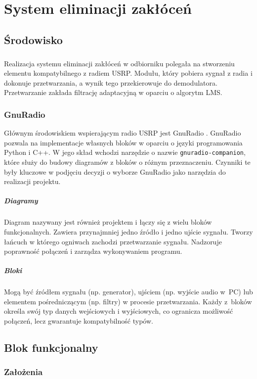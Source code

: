 \chapter{System eliminacji zakłóceń}
\section{Środowisko}
\paragraph{}
Realizacja systemu eliminacji zakłóceń w odbiorniku polegała na stworzeniu elementu kompatybilnego z radiem USRP. Modułu, który pobiera sygnał z radia i dokonuje przetwarzania, a wynik tego przekierowuje do demodulatora.
Przetwarzanie zakłada filtrację adaptacyjną w oparciu o algorytm LMS.
\subsection{GnuRadio}
Głównym środowiskiem wspierającym radio USRP jest GnuRadio \cite{gnuradio}. GnuRadio pozwala na implementacje własnych bloków w oparciu o języki programowania Python i C++. W jego skład wchodzi narzędzie o nazwie \texttt{gnuradio-companion}, które służy do budowy diagramów z bloków o różnym przeznaczeniu. Czynniki te były kluczowe w podjęciu decyzji o wyborze GnuRadio jako narzędzia do realizacji projektu.
\paragraph*{Diagramy}
    Diagram nazywany jest również projektem i łączy się z wielu bloków funkcjonalnych.
    Zawiera przynajmniej jedno źródło i jedno ujście sygnału.
    Tworzy łańcuch w którego ogniwach zachodzi przetwarzanie sygnału.
    Nadzoruje poprawność połączeń i zarządza wykonywaniem programu.
\paragraph*{Bloki}
    Mogą być źródłem sygnału (np. generator), ujściem (np. wyjście audio w~PC) lub elementem pośredniczącym (np. filtry) w procesie przetwarzania. 
Każdy z~bloków określa swój typ danych wejściowych i wyjściowych, co ogranicza możliwość połączeń, lecz gwarantuje kompatybilność typów.

\section{Blok funkcjonalny}
\subsection{Założenia}
